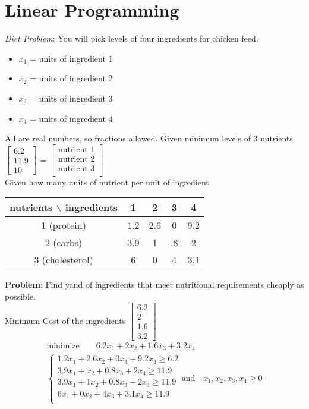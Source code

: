 \section*{Linear Programming}
\begin{example-N}
	\emph{Diet Problem}: You will pick levels of four ingredients for chicken feed.
	\begin{multicols}{2}
		\begin{itemize}
		\item $x_1$ = units of ingredient 1
		\item $x_2$ = units of ingredient 2
		\item $x_3$ = units of ingredient 3
		\item $x_4$ = units of ingredient 4 
	\end{itemize}
	\end{multicols}
	All are real numbers, so fractions allowed.
	Given minimum levels of 3 nutrients $\begin{bmatrix}
		6.2\\11.9\\10
	\end{bmatrix}$ = $\begin{bmatrix}
		\text{nutrient 1}\\
		\text{nutrient 2}\\
		\text{nutrient 3}\\
	\end{bmatrix}$\\
	Given how many units of nutrient per unit of ingredient
	\begin{center}
	\begin{tabular} {c||c|c|c|c}
	nutrients $\backslash$ ingredients & 1 & 2 & 3 & 4\\
	\hline 
		1 (protein) & 1.2 & 2.6 & 0 & 9.2\\
		2 (carbs) & 3.9 & 1 & .8 & 2\\
		3 (cholesterol) & 6 & 0 & 4 & 3.1
	\end{tabular}
	\end{center}
	\textbf{Problem}: Find yand of ingredients that meet nutritional requirements cheaply as possible.\\
	Minimum Cost of the ingredients $\begin{bmatrix}
		6.2\\2\\1.6\\3.2
	\end{bmatrix}$
	\begin{gather*}
		\text{minimize} \qquad 6.2x_1 + 2x_2 + 1.6x_3 + 3.2x_4\\
		\begin{cases}
			1.2x_1 + 2.6x_2 + 0x_3 + 9.2x_4	\geq 6.2\\
		3.9x_1 + x_2 + 0.8x_3 + 2x_4 \geq 11.9\\
		3.9x_1 + 1x_2 + 0.8x_3 + 2 x_4 \geq 11.9\\
		6x_1 + 0x_2 + 4x_3 + 3.1x_4 \geq 11.9\\
		\end{cases}
		\text{and} \quad x_1, x_2, x_3, x_4 \geq 0
	\end{gather*}
\end{example-N}
